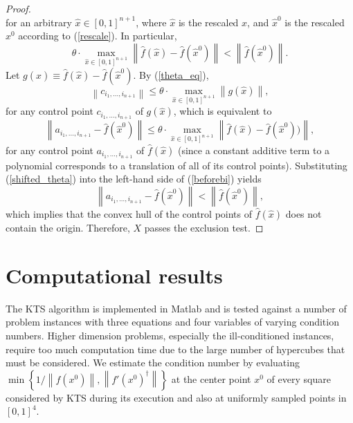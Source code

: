 \documentclass{article}
\newcommand{\norm}[1]{\left\|#1\right\|} \newcommand{\norma}[1]{\left\|#1\right\|}   \newcommand{\inv}[1]{#1^{-1}}
\newcommand{\mpinv}[1]{#1^{\dagger}}  \newcommand\eps{\epsilon}
\begin{document}
\begin{proof}
\[\]
for an arbitrary $\hat{x} \in [0,1]^{n+1}$, where $\hat{x}$ is the rescaled
$x$, and $\hat{x}^0$ is the rescaled $x^0$ according to
(\ref{rescale}). In particular,
\begin{equation}
\label{beforebi} \theta\cdot\max_{\hat{x} \in
[0,1]^{n+1}}\norm{\hat{f}(\hat{x})-\hat{f}(\hat{x}^0)} <
\norm{\hat{f}(\hat{x}^0)}.
\end{equation}
Let $g(\hat{x}) \equiv \hat f(\hat{x})-\hat f(\hat{x}^0)$. 
By (\ref{theta_eq}),
\begin{equation}
\label{fromlemma} \norm{c_{i_1,\ldots,i_{n+1}}} \leq \theta\cdot\max_{\hat{x}
\in [0,1]^{n+1}}\norm{g(\hat{x})},
\end{equation}
for any control point $c_{i_1,\ldots,i_{n+1}}$ of $g(\hat{x})$, which is
equivalent to
\begin{equation}
\label{shifted_theta} \norm{a_{i_1,\ldots,i_{n+1}}-\hat f(\hat{x}^0)} \leq
\theta\cdot\max_{\hat{x} \in
[0,1]^{n+1}}\norm{\hat f (\hat{x})-\hat f(\hat{x}^0))},
\end{equation}
for any control point $a_{i_1,\ldots,i_{n+1}}$ of $\hat f(\hat{x})$ (since a constant
additive term to a polynomial corresponds to a translation of all of
its control points). Substituting
(\ref{shifted_theta}) into the left-hand side of (\ref{beforebi})
yields
\begin{equation}
\label{convexnozero} \norm{a_{i_1,\ldots,i_{n+1}}-\hat f(\hat{x}^0)} <
\norm{\hat f(\hat{x}^0)},
\end{equation}
which implies that the convex hull of the control points of
$\hat f(\hat{x})$ does not contain the origin. 
Therefore, $X$ passes the exclusion test.
\end{proof}


\section{Computational results}
\label{section_comp}
The KTS algorithm is implemented in Matlab and is tested against a
number of problem instances with three equations and four variables of varying condition numbers.  Higher dimension problems, especially the ill-conditioned instances, require too much computation time due to the large number of hypercubes that must be considered.  We estimate the condition number by evaluating $\min \left\{ 1/\norm{f(x^0)}, \norm{\mpinv{f'(x^0)}} \right\}$ at the center point $x^0$ of every square considered by KTS during its execution and also at uniformly sampled points in $[0,1]^4$.  
\end{document}

